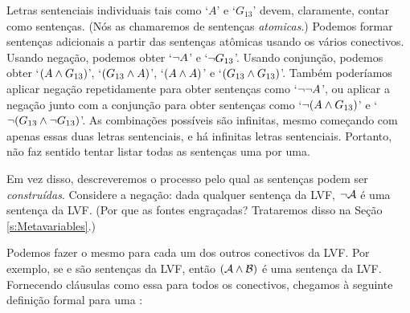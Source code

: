 Letras sentenciais individuais tais como `$A$' e `$G_{13}$' devem, claramente, contar como sentenças.
(Nós as chamaremos de sentenças \emph{atomicas}.)
Podemos formar sentenças adicionais a partir das sentenças atômicas usando os vários conectivos.
Usando negação, podemos obter `$\neg A$' e `$\neg G_{13} $'.
Usando conjunção, podemos obter `$(A \wedge G_{13})$', `$(G_{13} \wedge A)$', `$(A \wedge A)$' e `$(G_{13} \wedge G_{13})$'.
Também poderíamos aplicar negação repetidamente para obter sentenças como `$\neg\neg A$', ou aplicar a negação junto com a conjunção para obter sentenças como `$\neg(A \wedge G_{13})$' e `$\neg(G_{13} \wedge \neg G_{13})$'.
As combinações possíveis são infinitas, mesmo começando com apenas essas duas letras sentenciais, e há infinitas letras sentenciais.
Portanto, não faz sentido tentar listar todas as sentenças uma por uma.

Em vez disso, descreveremos o processo pelo qual as sentenças podem ser \emph{construídas}.
Considere a negação: dada qualquer sentença  da LVF, $\neg\mathcal{A}$ é uma sentença da LVF.
(Por que as fontes engraçadas? Trataremos disso na Seção \ref{s:Metavariables}.)

Podemos fazer o mesmo para cada um dos outros conectivos da LVF.
Por exemplo, se  e  são sentenças da LVF, então $(\mathcal{A}\wedge\mathcal{B})$ é uma sentença da LVF.
Fornecendo cláusulas como essa para todos os conectivos, chegamos à seguinte definição formal para uma :
{\small 
	}

